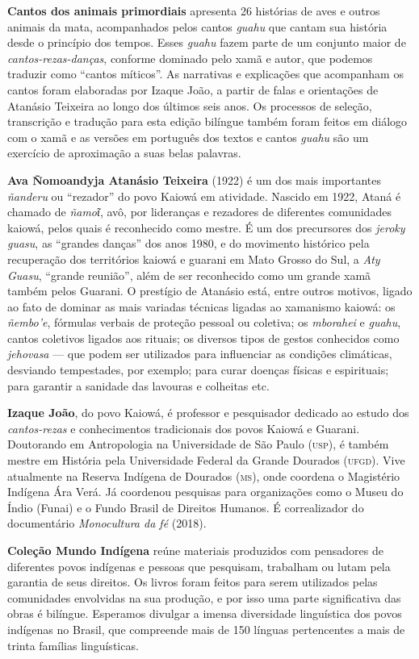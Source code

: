 \textbf{Cantos dos animais primordiais} apresenta 26 histórias de aves e outros animais da
mata, acompanhados pelos cantos \textit{guahu} que cantam sua história
desde o princípio dos tempos. Esses \textit{guahu} fazem parte de um
conjunto maior de \textit{cantos-rezas-danças}, conforme dominado pelo xamã e autor, que podemos traduzir como ``cantos míticos''. As
narrativas e explicações que acompanham os cantos foram elaboradas por
Izaque João, a partir de falas e orientações de Atanásio Teixeira ao
longo dos últimos seis anos. Os processos de seleção, transcrição e
tradução para esta edição bilíngue também foram feitos em diálogo com o
xamã e as versões em português dos textos e cantos \textit{guahu} são um
exercício de aproximação a suas belas palavras.

\textbf{Ava Ñomoandyja Atanásio Teixeira} (1922) é um dos mais importantes \textit{ñanderu} ou ``rezador'' do povo Kaiowá em atividade. Nascido em 1922, Ataná é chamado de \textit{ñamoῖ}, avô, por lideranças e rezadores de diferentes comunidades kaiowá, pelos quais é reconhecido como mestre. É um dos precursores dos \textit{jeroky guasu}, as ``grandes danças'' dos anos 1980, e do movimento histórico pela recuperação dos territórios kaiowá e guarani em Mato Grosso do Sul, a \textit{Aty Guasu}, ``grande reunião'', além de ser reconhecido como um grande xamã também pelos Guarani. O prestígio de Atanásio está, entre outros motivos, ligado ao fato de dominar as mais variadas técnicas ligadas ao xamanismo kaiowá: os \textit{ñembo'e}, fórmulas verbais de proteção pessoal ou coletiva; os \textit{mborahei} e \textit{guahu}, cantos coletivos ligados aos rituais; os diversos tipos de gestos conhecidos como \textit{jehovasa} --- que podem ser utilizados para influenciar as condições climáticas, desviando tempestades, por exemplo; para curar doenças físicas e espirituais; para garantir a sanidade das lavouras e colheitas etc.

\textbf{Izaque João}, do povo Kaiowá, é professor e pesquisador dedicado ao estudo dos \textit{cantos-rezas} e conhecimentos tradicionais dos povos Kaiowá e Guarani. Doutorando em
Antropologia na Universidade de São Paulo (\textsc{usp}), é também mestre em História pela
Universidade Federal da Grande Dourados (\textsc{ufgd}). Vive atualmente na Reserva
Indígena de Dourados (\textsc{ms}), onde coordena o Magistério Indígena Ára Verá. Já
coordenou pesquisas para organizações como o Museu do Índio (Funai) e o Fundo
Brasil de Direitos Humanos. É correalizador do documentário \textit{Monocultura da fé} (2018).

\textbf{Coleção Mundo Indígena} reúne materiais produzidos com pensadores de diferentes povos indígenas e pessoas que pesquisam, trabalham ou lutam pela garantia de seus direitos. Os livros foram feitos para serem utilizados pelas comunidades envolvidas na sua produção, e por isso uma parte significativa das obras é bilíngue. Esperamos divulgar a imensa diversidade linguística dos povos indígenas no Brasil, que compreende mais de 150 línguas pertencentes a mais de trinta famílias linguísticas.



